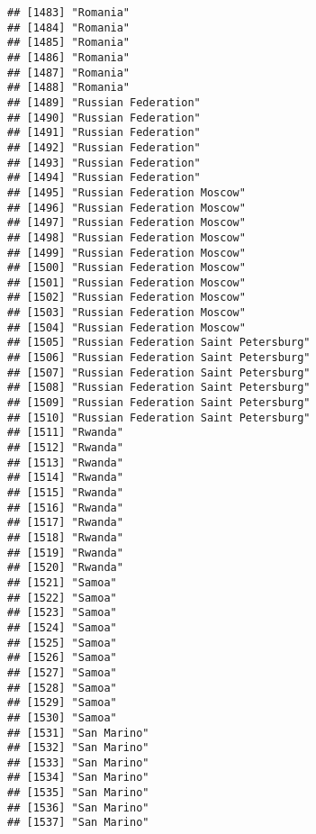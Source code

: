 \documentclass[]{article}
\begin{document}
\begin{verbatim}
## [1483] "Romania"                            
## [1484] "Romania"                            
## [1485] "Romania"                            
## [1486] "Romania"                            
## [1487] "Romania"                            
## [1488] "Romania"                            
## [1489] "Russian Federation"                 
## [1490] "Russian Federation"                 
## [1491] "Russian Federation"                 
## [1492] "Russian Federation"                 
## [1493] "Russian Federation"                 
## [1494] "Russian Federation"                 
## [1495] "Russian Federation Moscow"          
## [1496] "Russian Federation Moscow"          
## [1497] "Russian Federation Moscow"          
## [1498] "Russian Federation Moscow"          
## [1499] "Russian Federation Moscow"          
## [1500] "Russian Federation Moscow"          
## [1501] "Russian Federation Moscow"          
## [1502] "Russian Federation Moscow"          
## [1503] "Russian Federation Moscow"          
## [1504] "Russian Federation Moscow"          
## [1505] "Russian Federation Saint Petersburg"
## [1506] "Russian Federation Saint Petersburg"
## [1507] "Russian Federation Saint Petersburg"
## [1508] "Russian Federation Saint Petersburg"
## [1509] "Russian Federation Saint Petersburg"
## [1510] "Russian Federation Saint Petersburg"
## [1511] "Rwanda"                             
## [1512] "Rwanda"                             
## [1513] "Rwanda"                             
## [1514] "Rwanda"                             
## [1515] "Rwanda"                             
## [1516] "Rwanda"                             
## [1517] "Rwanda"                             
## [1518] "Rwanda"                             
## [1519] "Rwanda"                             
## [1520] "Rwanda"                             
## [1521] "Samoa"                              
## [1522] "Samoa"                              
## [1523] "Samoa"                              
## [1524] "Samoa"                              
## [1525] "Samoa"                              
## [1526] "Samoa"                              
## [1527] "Samoa"                              
## [1528] "Samoa"                              
## [1529] "Samoa"                              
## [1530] "Samoa"                              
## [1531] "San Marino"                         
## [1532] "San Marino"                         
## [1533] "San Marino"                         
## [1534] "San Marino"                         
## [1535] "San Marino"                         
## [1536] "San Marino"                         
## [1537] "San Marino"                         

\end{verbatim}
\end{document}
